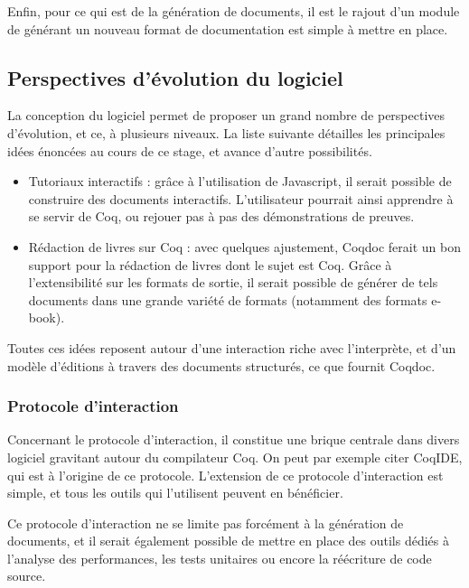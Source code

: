 \documentclass[a4paper, 11pt]{report}
\begin{document}
    Enfin, pour ce qui est de la génération de documents, il est le rajout
    d'un module de générant un nouveau format de documentation est simple à
    mettre en place.

    \subsection{Perspectives d'évolution du logiciel}
    La conception du logiciel permet de proposer un grand nombre de perspectives
    d'évolution, et ce, à plusieurs niveaux. La liste suivante détailles les
    principales idées énoncées au cours de ce stage, et avance d'autre possibilités.
    \begin{itemize}
      \item Tutoriaux interactifs : grâce à l'utilisation de Javascript,
        il serait possible de construire des documents interactifs.
        L'utilisateur pourrait ainsi apprendre à se servir de Coq, ou rejouer
        pas à pas des démonstrations de preuves.
      \item Rédaction de livres sur Coq : avec quelques ajustement, Coqdoc
        ferait un bon support pour la rédaction de livres dont le sujet est
        Coq. Grâce à l'extensibilité sur les formats de sortie, il serait
        possible de générer de tels documents dans une grande variété de
        formats (notamment des formats e-book).
    \end{itemize}

    Toutes ces idées reposent autour d'une interaction riche avec l'interprète,
    et d'un modèle d'éditions à travers des documents structurés, ce que
    fournit Coqdoc.

    \subsubsection{Protocole d'interaction}
    Concernant le protocole d'interaction, il constitue une brique centrale
    dans divers logiciel gravitant autour du compilateur Coq. On peut par exemple
    citer CoqIDE, qui est à l'origine de ce protocole.
    L'extension de ce protocole d'interaction est simple, et tous les outils
    qui l'utilisent peuvent en bénéficier.

    Ce protocole d'interaction ne se limite pas forcément à la génération de
    documents, et il serait également possible de mettre en place des outils
    dédiés à l'analyse des performances, les tests unitaires ou encore la
    réécriture de code source.
\end{document}
